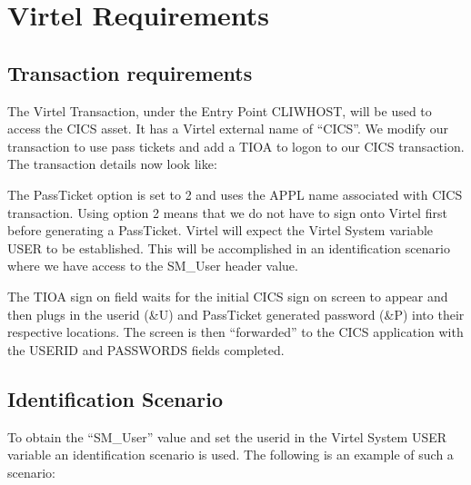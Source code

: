 \documentclass[letterpaper,10pt,english]{sphinxmanual}
\begin{document}
\newpage

\ignorespaces 

\section{Virtel Requirements}
\label{\detokenize{connectivity_guide:virtel-requirements}}\label{\detokenize{connectivity_guide:index-172}}

\subsection{Transaction requirements}
\label{\detokenize{connectivity_guide:transaction-requirements}}
\sphinxAtStartPar
The Virtel Transaction, under the Entry Point CLIWHOST, will be used to access the CICS asset. It has a Virtel external name of “CICS”. We modify our transaction to use pass tickets and add a TIOA to logon to our CICS transaction. The transaction details now look like:\sphinxhyphen{}

\sphinxAtStartPar
{} 

\sphinxAtStartPar
The PassTicket option is set to 2 and uses the APPL name associated with CICS transaction. Using option 2 means that we do not have to sign onto Virtel first before generating a PassTicket. Virtel will expect the Virtel System variable USER to be established. This will be accomplished in an identification scenario where we have access to the SM\_User header value.

\sphinxAtStartPar
The TIOA sign on field waits for the initial CICS sign on screen to appear and then plugs in the userid (\&U) and PassTicket generated password (\&P) into their respective locations. The screen is then “forwarded” to the CICS application with the USERID and PASSWORDS fields completed.

\newpage


\subsection{Identification Scenario}
\label{\detokenize{connectivity_guide:identification-scenario}}
\sphinxAtStartPar
To obtain the “SM\_User” value and set the userid in the Virtel System USER variable an identification scenario is used. The following is an example of such a scenario:\sphinxhyphen{}
\end{document}

